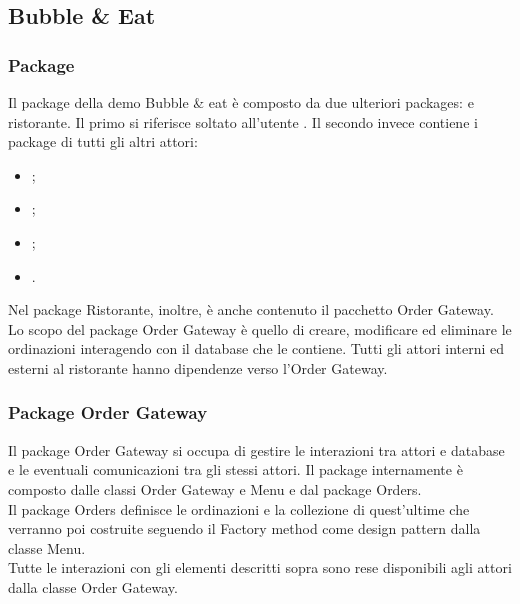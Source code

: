 \subsection{Bubble \& Eat}

\subsubsection{Package}
Il package della demo Bubble \& eat è composto da due ulteriori packages: \Customer{} e ristorante. 
Il primo si riferisce soltato all'utente \Customer{}. Il secondo invece contiene i package di tutti gli altri attori:
\begin{itemize}
	\item \Manager{};
	\item \Chef{};
	\item \Deliveryman{};
	\item \Purchasingmanager{}.
\end{itemize}
Nel package Ristorante, inoltre, è anche contenuto il pacchetto Order Gateway.\\
Lo scopo del package Order Gateway è quello di creare, modificare ed eliminare le ordinazioni interagendo con il database che le contiene.
Tutti gli attori interni ed esterni al ristorante hanno dipendenze verso l'Order Gateway.

\subsubsection{Package Order Gateway}
Il package Order Gateway si occupa di gestire le interazioni tra attori e database e le eventuali comunicazioni tra gli stessi attori. Il package internamente è composto dalle classi Order Gateway e Menu e dal package Orders.\\
Il package Orders definisce le ordinazioni e la collezione di quest'ultime che verranno poi costruite seguendo il Factory method come design pattern dalla classe Menu.\\
Tutte le interazioni con gli elementi descritti sopra sono rese disponibili agli attori dalla classe Order Gateway.

